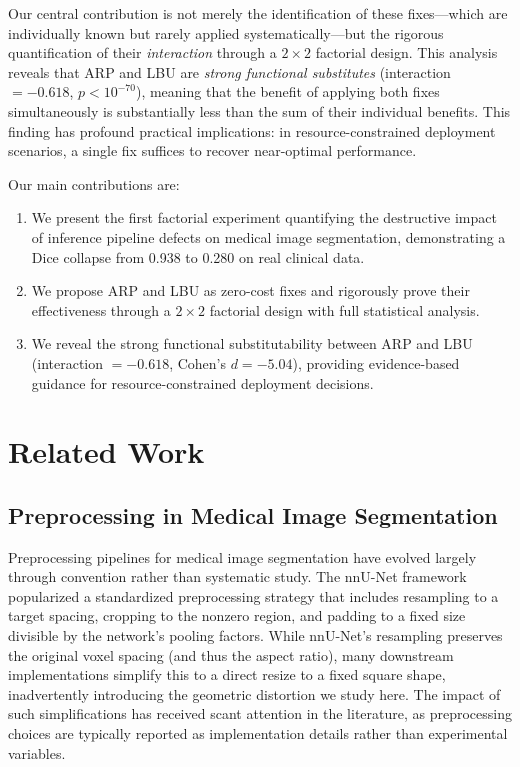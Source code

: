 \documentclass[10pt,twocolumn]{article}
\begin{document}
Our central contribution is not merely the identification of these fixes---which are individually known but rarely applied systematically---but the rigorous quantification of their \emph{interaction} through a $2\times2$ factorial design.
This analysis reveals that ARP and LBU are \emph{strong functional substitutes} (interaction $= -0.618$, $p < 10^{-70}$), meaning that the benefit of applying both fixes simultaneously is substantially less than the sum of their individual benefits.
This finding has profound practical implications: in resource-constrained deployment scenarios, a single fix suffices to recover near-optimal performance.

Our main contributions are:
\begin{enumerate}[leftmargin=*]
    \item We present the first factorial experiment quantifying the destructive impact of inference pipeline defects on medical image segmentation, demonstrating a Dice collapse from 0.938 to 0.280 on real clinical data.
    \item We propose ARP and LBU as zero-cost fixes and rigorously prove their effectiveness through a $2\times2$ factorial design with full statistical analysis.
    \item We reveal the strong functional substitutability between ARP and LBU (interaction $= -0.618$, Cohen's $d = -5.04$), providing evidence-based guidance for resource-constrained deployment decisions.
\end{enumerate}

\section{Related Work}
\label{sec:related}

\subsection{Preprocessing in Medical Image Segmentation}

Preprocessing pipelines for medical image segmentation have evolved largely through convention rather than systematic study.
The nnU-Net framework~\cite{isensee2021nnunet} popularized a standardized preprocessing strategy that includes resampling to a target spacing, cropping to the nonzero region, and padding to a fixed size divisible by the network's pooling factors.
While nnU-Net's resampling preserves the original voxel spacing (and thus the aspect ratio), many downstream implementations simplify this to a direct resize to a fixed square shape, inadvertently introducing the geometric distortion we study here.
The impact of such simplifications has received scant attention in the literature, as preprocessing choices are typically reported as implementation details rather than experimental variables.
\end{document}
